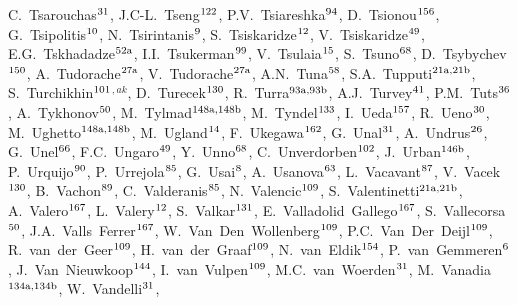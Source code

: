 \begin{flushleft}
C.~Tsarouchas$^\textrm{\scriptsize 31}$,
J.C-L.~Tseng$^\textrm{\scriptsize 122}$,
P.V.~Tsiareshka$^\textrm{\scriptsize 94}$,
D.~Tsionou$^\textrm{\scriptsize 156}$,
G.~Tsipolitis$^\textrm{\scriptsize 10}$,
N.~Tsirintanis$^\textrm{\scriptsize 9}$,
S.~Tsiskaridze$^\textrm{\scriptsize 12}$,
V.~Tsiskaridze$^\textrm{\scriptsize 49}$,
E.G.~Tskhadadze$^\textrm{\scriptsize 52a}$,
I.I.~Tsukerman$^\textrm{\scriptsize 99}$,
V.~Tsulaia$^\textrm{\scriptsize 15}$,
S.~Tsuno$^\textrm{\scriptsize 68}$,
D.~Tsybychev$^\textrm{\scriptsize 150}$,
A.~Tudorache$^\textrm{\scriptsize 27a}$,
V.~Tudorache$^\textrm{\scriptsize 27a}$,
A.N.~Tuna$^\textrm{\scriptsize 58}$,
S.A.~Tupputi$^\textrm{\scriptsize 21a,21b}$,
S.~Turchikhin$^\textrm{\scriptsize 101}$$^{,ak}$,
D.~Turecek$^\textrm{\scriptsize 130}$,
R.~Turra$^\textrm{\scriptsize 93a,93b}$,
A.J.~Turvey$^\textrm{\scriptsize 41}$,
P.M.~Tuts$^\textrm{\scriptsize 36}$,
A.~Tykhonov$^\textrm{\scriptsize 50}$,
M.~Tylmad$^\textrm{\scriptsize 148a,148b}$,
M.~Tyndel$^\textrm{\scriptsize 133}$,
I.~Ueda$^\textrm{\scriptsize 157}$,
R.~Ueno$^\textrm{\scriptsize 30}$,
M.~Ughetto$^\textrm{\scriptsize 148a,148b}$,
M.~Ugland$^\textrm{\scriptsize 14}$,
F.~Ukegawa$^\textrm{\scriptsize 162}$,
G.~Unal$^\textrm{\scriptsize 31}$,
A.~Undrus$^\textrm{\scriptsize 26}$,
G.~Unel$^\textrm{\scriptsize 66}$,
F.C.~Ungaro$^\textrm{\scriptsize 49}$,
Y.~Unno$^\textrm{\scriptsize 68}$,
C.~Unverdorben$^\textrm{\scriptsize 102}$,
J.~Urban$^\textrm{\scriptsize 146b}$,
P.~Urquijo$^\textrm{\scriptsize 90}$,
P.~Urrejola$^\textrm{\scriptsize 85}$,
G.~Usai$^\textrm{\scriptsize 8}$,
A.~Usanova$^\textrm{\scriptsize 63}$,
L.~Vacavant$^\textrm{\scriptsize 87}$,
V.~Vacek$^\textrm{\scriptsize 130}$,
B.~Vachon$^\textrm{\scriptsize 89}$,
C.~Valderanis$^\textrm{\scriptsize 85}$,
N.~Valencic$^\textrm{\scriptsize 109}$,
S.~Valentinetti$^\textrm{\scriptsize 21a,21b}$,
A.~Valero$^\textrm{\scriptsize 167}$,
L.~Valery$^\textrm{\scriptsize 12}$,
S.~Valkar$^\textrm{\scriptsize 131}$,
E.~Valladolid~Gallego$^\textrm{\scriptsize 167}$,
S.~Vallecorsa$^\textrm{\scriptsize 50}$,
J.A.~Valls~Ferrer$^\textrm{\scriptsize 167}$,
W.~Van~Den~Wollenberg$^\textrm{\scriptsize 109}$,
P.C.~Van~Der~Deijl$^\textrm{\scriptsize 109}$,
R.~van~der~Geer$^\textrm{\scriptsize 109}$,
H.~van~der~Graaf$^\textrm{\scriptsize 109}$,
N.~van~Eldik$^\textrm{\scriptsize 154}$,
P.~van~Gemmeren$^\textrm{\scriptsize 6}$,
J.~Van~Nieuwkoop$^\textrm{\scriptsize 144}$,
I.~van~Vulpen$^\textrm{\scriptsize 109}$,
M.C.~van~Woerden$^\textrm{\scriptsize 31}$,
M.~Vanadia$^\textrm{\scriptsize 134a,134b}$,
W.~Vandelli$^\textrm{\scriptsize 31}$,
$$
\end{flushleft}
